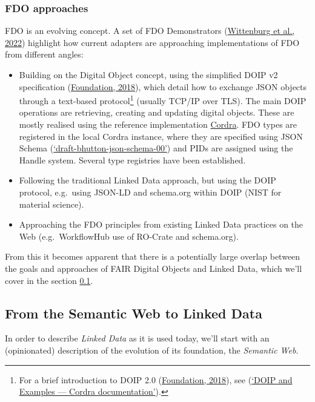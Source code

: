 \hypertarget{fdo-approaches}{%
\subsubsection{FDO approaches}\label{fdo-approaches}}

FDO is an evolving concept. A set of FDO Demonstrators (\protect\hyperlink{ref-jRWurmQc}{Wittenburg et al., 2022}) highlight how current adapters are approaching implementations of FDO from different angles:

\begin{itemize}
\tightlist
\item
  Building on the Digital Object concept, using the simplified DOIP v2 specification (\protect\hyperlink{ref-13TcbsZF6}{Foundation, 2018}), which detail how to exchange JSON objects through a text-based protocol\footnote{For a brief introduction to DOIP 2.0 (\protect\hyperlink{ref-13TcbsZF6}{Foundation, 2018}), see (\protect\hyperlink{ref-xuQKRRx5}{{`DOIP and Examples --- Cordra documentation'}}).} (usually TCP/IP over TLS). The main DOIP operations are retrieving, creating and updating digital objects. These are mostly realised using the reference implementation \href{https://cordra.org/}{Cordra}. FDO types are registered in the local Cordra instance, where they are specified using JSON Schema (\protect\hyperlink{ref-15EZ2D0Rm}{{`draft-bhutton-json-schema-00'}}) and PIDs are assigned using the Handle system. Several type registries have been established.
\item
  Following the traditional Linked Data approach, but using the DOIP protocol, e.g.~using JSON-LD and schema.org within DOIP (NIST for material science).
\item
  Approaching the FDO principles from existing Linked Data practices on the Web (e.g.~WorkflowHub use of RO-Crate and schema.org).
\end{itemize}

From this it becomes apparent that there is a potentially large overlap between the goals and approaches of FAIR Digital Objects and Linked Data, which we'll cover in the section \ref{sec:ld}.

\hypertarget{sec:ld}{%
\subsection{From the Semantic Web to Linked Data}\label{sec:ld}}

In order to describe \emph{Linked Data} as it is used today, we'll start with an (opinionated) description of the evolution of its foundation, the \emph{Semantic Web}.

